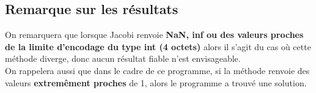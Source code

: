 \subsection{Remarque sur les résultats}
On remarquera que lorsque Jacobi renvoie \textbf{NaN, inf ou des valeurs proches de la limite d'encodage du type int (4 octets)} alors il s'agit du cas où cette méthode diverge, donc aucun résultat fiable n'est envisageable.\\
On rappelera aussi que dans le cadre de ce programme, si la méthode renvoie des valeurs \textbf{extremêment proches} de 1, alors le programme a trouvé une solution. 